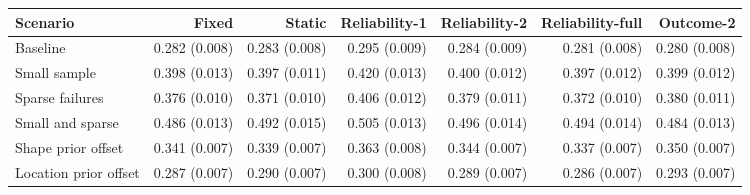 \begin{tabular}{lrrrrrr}
\toprule
Scenario & Fixed & Static & Reliability-1 & Reliability-2 & Reliability-full & Outcome-2 \\
\midrule
Baseline & 0.282 (0.008) & 0.283 (0.008) & 0.295 (0.009) & 0.284 (0.009) & 0.281 (0.008) & 0.280 (0.008) \\
Small sample & 0.398 (0.013) & 0.397 (0.011) & 0.420 (0.013) & 0.400 (0.012) & 0.397 (0.012) & 0.399 (0.012) \\
Sparse failures & 0.376 (0.010) & 0.371 (0.010) & 0.406 (0.012) & 0.379 (0.011) & 0.372 (0.010) & 0.380 (0.011) \\
Small and sparse & 0.486 (0.013) & 0.492 (0.015) & 0.505 (0.013) & 0.496 (0.014) & 0.494 (0.014) & 0.484 (0.013) \\
Shape prior offset & 0.341 (0.007) & 0.339 (0.007) & 0.363 (0.008) & 0.344 (0.007) & 0.337 (0.007) & 0.350 (0.007) \\
Location prior offset & 0.287 (0.007) & 0.290 (0.007) & 0.300 (0.008) & 0.289 (0.007) & 0.286 (0.007) & 0.293 (0.007) \\
\bottomrule
\end{tabular}
